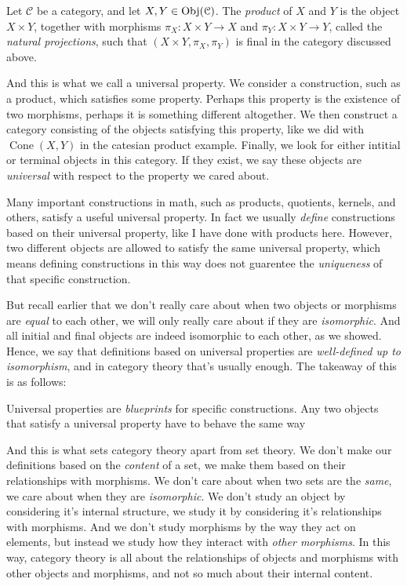 \documentclass[11pt, letterpaper]{article}
\begin{document}
\begin{definition}[Product]\label{dfn:5}
	Let $\mathcal{C} $ be a category, and let $X,Y\in \operatorname{Obj}(\mathcal{C} ) $. The \emph{product} of $X$ and $Y$ is the object $X\times Y$, together with morphisms $\pi_X : X\times Y \to X$ and $\pi _Y : X\times Y \to Y$, called the \emph{natural projections}, such that $(X\times Y,\pi _X,\pi _Y)$ is final in the category discussed above.
\end{definition}

And this is what we call a universal property. We consider a construction, such as a product, which satisfies some property. Perhaps this property is the existence of two morphisms, perhaps it is something different altogether. We then construct a category consisting of the objects satisfying this property, like we did with $\operatorname{Cone} (X,Y)$ in the catesian product example. Finally, we look for either intitial or terminal objects in this category. If they exist, we say these objects are \emph{universal} with respect to the property we cared about.

Many important constructions in math, such as products, quotients, kernels, and others, satisfy a useful universal property. In fact we usually \emph{define} constructions based on their universal property, like I have done with products here. However, two different objects are allowed to satisfy the same universal property, which means defining constructions in this way does not guarentee the \emph{uniqueness} of that specific construction.

But recall earlier that we don't really care about when two objects or morphisms are \emph{equal} to each other, we will only really care about if they are \emph{isomorphic}. And all initial and final objects are indeed isomorphic to each other, as we showed. Hence, we say that definitions based on universal properties are \emph{well-defined up to isomorphism}, and in category theory that's usually enough. The takeaway of this is as follows:
\begin{displayquote}
	Universal properties are \emph{blueprints} for specific constructions. Any two objects that satisfy a universal property have to behave the same way
\end{displayquote}

And this is what sets category theory apart from set theory. We don't make our definitions based on the \emph{content} of a set, we make them based on their relationships with morphisms. We don't care about when two sets are the \emph{same}, we care about when they are \emph{isomorphic}. We don't study an object by considering it's internal structure, we study it by considering it's relationships with morphisms. And we don't study morphisms by the way they act on elements, but instead we study how they interact with \emph{other morphisms}. In this way, category theory is all about the relationships of objects and morphisms with other objects and morphisms, and not so much about their internal content.
\end{document}
